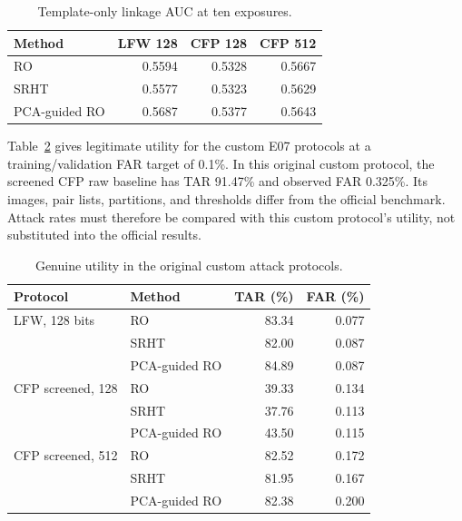 \begin{table}[t]
\caption{Template-only linkage AUC at ten exposures.}
\label{tab:linkage}\centering\small
\begin{tabular}{@{}lrrr@{}}\toprule
Method & LFW 128 & CFP 128 & CFP 512\\\midrule
RO & 0.5594 & 0.5328 & 0.5667\\
SRHT & 0.5577 & 0.5323 & 0.5629\\
PCA-guided RO & 0.5687 & 0.5377 & 0.5643\\\bottomrule
\end{tabular}
\end{table}


Table~\ref{tab:attackutility} gives legitimate utility for the custom E07 protocols at a training/validation FAR target of 0.1\%. In this original custom protocol, the screened CFP raw baseline has TAR 91.47\% and observed FAR 0.325\%. Its images, pair lists, partitions, and thresholds differ from the official benchmark. Attack rates must therefore be compared with this custom protocol's utility, not substituted into the official results.

\begin{table}[t]
\caption{Genuine utility in the original custom attack protocols.}
\label{tab:attackutility}\centering\small
\begin{tabular}{@{}llrr@{}}\toprule
Protocol & Method & TAR (\%) & FAR (\%)\\\midrule
LFW, 128 bits & RO & 83.34 & 0.077\\
 & SRHT & 82.00 & 0.087\\
 & PCA-guided RO & 84.89 & 0.087\\
CFP screened, 128 & RO & 39.33 & 0.134\\
 & SRHT & 37.76 & 0.113\\
 & PCA-guided RO & 43.50 & 0.115\\
CFP screened, 512 & RO & 82.52 & 0.172\\
 & SRHT & 81.95 & 0.167\\
 & PCA-guided RO & 82.38 & 0.200\\\bottomrule
\end{tabular}
\end{table}

